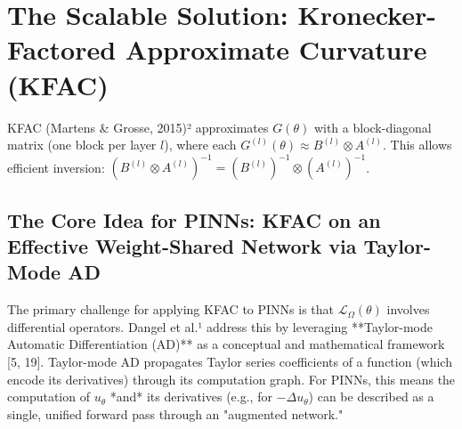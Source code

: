 \documentclass[12pt,a4paper]{article}
\newcommand{\kron}{\otimes}
\begin{document}
\section{The Scalable Solution: Kronecker-Factored Approximate Curvature (KFAC)}
KFAC (Martens \& Grosse, 2015)² approximates \(G(\theta)\) with a block-diagonal matrix (one block per layer \(l\)), where each \(G^{(l)}(\theta) \approx B^{(l)} \kron A^{(l)}\). This allows efficient inversion: \((B^{(l)} \kron A^{(l)})^{-1} = (B^{(l)})^{-1} \kron (A^{(l)})^{-1}\).

\subsection{The Core Idea for PINNs: KFAC on an Effective Weight-Shared Network via Taylor-Mode AD}
The primary challenge for applying KFAC to PINNs is that \(\mathcal{L}_\Omega(\theta)\) involves differential operators. Dangel et al.¹ address this by leveraging **Taylor-mode Automatic Differentiation (AD)** as a conceptual and mathematical framework [5, 19]. Taylor-mode AD propagates Taylor series coefficients of a function (which encode its derivatives) through its computation graph. For PINNs, this means the computation of \(u_\theta\) *and* its derivatives (e.g., for \(-\Delta u_\theta\)) can be described as a single, unified forward pass through an "augmented network."
\end{document}
